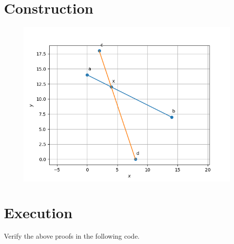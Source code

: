 \documentclass[10pt, a4paper]{article}
\begin{document}
\section{Construction}
\begin{figure}[h]
\includegraphics[scale=0.5]{optm.png} 
\end{figure}
\section{Execution}
Verify the above proofs in the following code.\\

\end{document}
